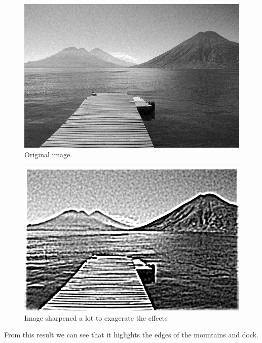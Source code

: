\documentclass[11pt]{article}
\begin{document}
\begin{FIGURE}
\begin{figure}[htbp]
\centering
\includegraphics[width=.9\linewidth]{ENG204-Assignment-3-Original.png}
\caption{Original image}
\end{figure}
\end{FIGURE}

\begin{FIGURE}
\begin{figure}[htbp]
\centering
\includegraphics[width=.9\linewidth]{ENG204-Assignment-3-Sharpened.png}
\caption{Image sharpened a lot to exagerate the effects}
\end{figure}
\end{FIGURE}
From this result we can see that it higlights the edges of the mountains and dock.
\end{document}
